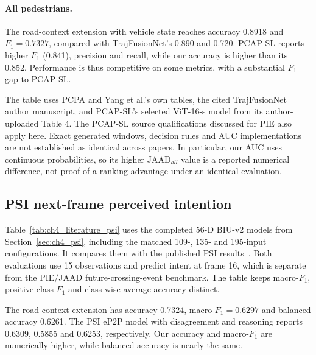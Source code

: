 \par\noindent\begin{minipage}{\textwidth}
\paragraph{All pedestrians.}
The road-context extension with vehicle state reaches accuracy 0.8918 and $F_1=0.7327$,
compared with TrajFusionNet's 0.890 and 0.720. PCAP-SL reports higher $F_1$ (0.841),
precision and recall, while our accuracy is higher than its 0.852. Performance is thus
competitive on some metrics, with a substantial $F_1$ gap to PCAP-SL.
\end{minipage}\par

The table uses PCPA and Yang et al.'s own tables, the cited TrajFusionNet author
manuscript, and PCAP-SL's selected ViT-16-s model from its author-uploaded Table 4.
The PCAP-SL source qualifications discussed for PIE also apply here. Exact generated
windows, decision rules and AUC implementations are not established as identical across
papers. In particular, our AUC uses continuous probabilities, so its higher JAAD$_{all}$
value is a reported numerical difference, not proof of a ranking advantage under an
identical evaluation.

\subsection{PSI next-frame perceived intention}

Table~\ref{tab:ch4_literature_psi} uses the completed 56-D BIU-v2 models from
Section~\ref{sec:ch4_psi}, including the matched 109-, 135- and 195-input configurations.
It compares them with the published PSI results~\cite{Jing2025PSI}.
Both evaluations use 15 observations and
predict intent at frame 16, which is separate from the PIE/JAAD future-crossing-event
benchmark. The table keeps macro-$F_1$, positive-class $F_1$ and class-wise average
accuracy distinct.



The road-context extension has accuracy 0.7324, macro-$F_1=0.6297$ and balanced accuracy
0.6261. The PSI eP2P model with disagreement and reasoning reports 0.6309, 0.5855
and 0.6253, respectively. Our accuracy and macro-$F_1$ are numerically higher, while
balanced accuracy is nearly the same.

